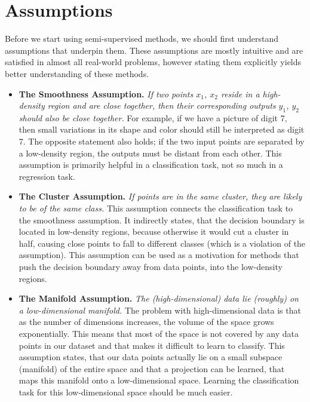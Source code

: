 \section{Assumptions}
\label{sec:SslAssumptions}

Before we start using semi-supervised methods, we should first understand assumptions that underpin them. These assumptions are mostly intuitive and are satisfied in almost all real-world problems, however stating them explicitly yields better understanding of these methods.

\begin{itemize}
    \item \textbf{The Smoothness Assumption.} \emph{If two points $x_1$, $x_2$ reside in a high-density region and are close together, then their corresponding outputs $y_1$, $y_2$ should also be close together.} For example, if we have a picture of digit 7, then small variations in its shape and color should still be interpreted as digit 7. The opposite statement also holds; if the two input points are separated by a low-density region, the outputs must be distant from each other. This assumption is primarily helpful in a classification task, not so much in a regression task.
    \item  \textbf{The Cluster Assumption.} \emph{If points are in the same cluster, they are likely to be of the same class.} This assumption connects the classification task to the smoothness assumption. It indirectly states, that the decision boundary is located in low-density regions, because otherwise it would cut a cluster in half, causing close points to fall to different classes (which is a violation of the assumption). This assumption can be used as a motivation for methods that push the decision boundary away from data points, into the low-density regions.
    \item \textbf{The Manifold Assumption.} \emph{The (high-dimensional) data lie (roughly) on a low-dimensional manifold.} The problem with high-dimensional data is that as the number of dimensions increases, the volume of the space grows exponentially. This means that most of the space is not covered by any data points in our dataset and that makes it difficult to learn to classify. This assumption states, that our data points actually lie on a small subspace (manifold) of the entire space and that a projection can be learned, that maps this manifold onto a low-dimensional space. Learning the classification task for this low-dimensional space should be much easier.
\end{itemize}


